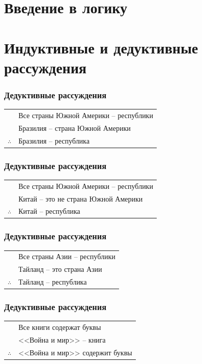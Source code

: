 \documentclass[24pt,pdf,hyperref={unicode},aspectratio=169]{beamer}
\begin{document}
\section{Введение в логику}

\section{Индуктивные и дедуктивные рассуждения}

\begin{frame}\frametitle{Дедуктивные рассуждения}
\begin{tabular}{l l}
 & Все страны Южной Америки -- республики \\
 & Бразилия -- страна Южной Америки\\
 \hline
$\therefore$ & Бразилия -- республика \\
\end{tabular}
\end{frame}

\begin{frame}\frametitle{Дедуктивные рассуждения}
\begin{tabular}{l l}
 & Все страны Южной Америки -- республики \\
 & Китай -- это не страна Южной Америки\\
 \hline
$\therefore$ & Китай -- республика \\
\end{tabular}
\end{frame}

\begin{frame}\frametitle{Дедуктивные рассуждения}
\begin{tabular}{l l}
 & Все страны Азии -- республики \\
 & Тайланд -- это страна Азии\\
 \hline
$\therefore$ & Тайланд -- республика \\
\end{tabular}
\end{frame}

\begin{frame}\frametitle{Дедуктивные рассуждения}
\begin{tabular}{l l}
 & Все книги содержат буквы \\
 & <<Война и мир>> -- книга \\
 \hline
$\therefore$ & <<Война и мир>> содержит буквы\\
\end{tabular}
\end{frame}
\end{document}
